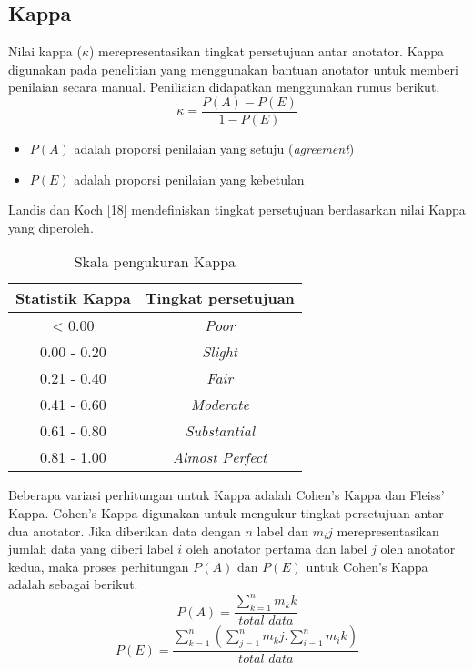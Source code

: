 \subsection{Kappa}
Nilai kappa ($\kappa$) merepresentasikan tingkat persetujuan antar anotator. Kappa digunakan pada penelitian yang menggunakan bantuan anotator untuk memberi penilaian secara manual. Peniliaian didapatkan menggunakan rumus berikut.
\[ \kappa=\frac{P(A)-P(E)}{1-P(E)} \]
\begin{itemize}
  \item $P(A)$ adalah proporsi penilaian yang setuju (\textit{agreement})
  \item $P(E)$ adalah proporsi penilaian yang kebetulan
\end{itemize}
Landis dan Koch [18] mendefiniskan tingkat persetujuan berdasarkan nilai Kappa yang diperoleh. 
\begin{table}
  \centering
    \caption{Skala pengukuran Kappa}
    \label{table:skalaKappa}
    \begin{tabular}{|c|c|}
      \hline
      Statistik Kappa & Tingkat persetujuan \\ \hline
      < 0.00 & \textit{Poor} \\ \hline
      0.00 - 0.20 & \textit{Slight} \\ \hline
      0.21 - 0.40 & \textit{Fair} \\ \hline
      0.41 - 0.60 & \textit{Moderate} \\ \hline
      0.61 - 0.80 & \textit{Substantial} \\ \hline
      0.81 - 1.00 & \textit{Almost Perfect} \\ \hline
    \end{tabular}
\end{table}

Beberapa variasi perhitungan untuk Kappa adalah Cohen's Kappa dan Fleiss' Kappa. Cohen's Kappa digunakan untuk mengukur tingkat persetujuan antar dua anotator. Jika diberikan data dengan $n$ label dan $m_ij$ merepresentasikan jumlah data yang diberi label $i$ oleh anotator pertama dan label $j$ oleh anotator kedua, maka proses perhitungan $P(A)$ dan $P(E)$ untuk Cohen's Kappa adalah sebagai berikut.
\[ P(A)=\frac{\sum_{k=1}^{n} m_kk}{total\,\,data} \]
\[ P(E)=\frac{\sum_{k=1}^{n} ( \sum_{j=1}^{n} m_kj . \sum_{i=1}^{n} m_ik ) }{total\,\,data} \]

